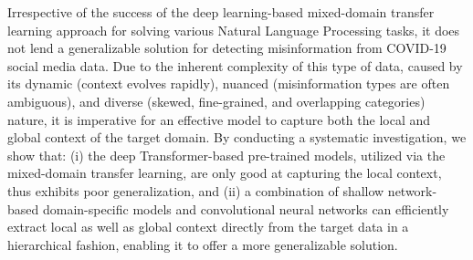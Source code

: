Irrespective of the success of the deep learning-based mixed-domain transfer learning approach for solving various Natural Language Processing tasks, it does not lend a generalizable solution for detecting misinformation from COVID-19 social media data. Due to the inherent complexity of this type of data, caused by its dynamic (context evolves rapidly), nuanced (misinformation types are often ambiguous), and diverse (skewed, fine-grained, and overlapping categories) nature, it is imperative for an effective model to capture both the local and global context of the target domain. By conducting a systematic investigation, we show that: (i) the deep Transformer-based pre-trained models, utilized via the mixed-domain transfer learning, are only good at capturing the local context, thus exhibits poor generalization, and (ii) a combination of shallow network-based domain-specific models and convolutional neural networks can efficiently extract local as well as global context directly from the target data in a hierarchical fashion, enabling it to offer a more generalizable solution.
